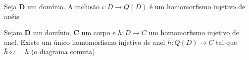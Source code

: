 \begin{proposition}
Seja $\bm D$ um domínio. A inclusão $\iota\colon D \to Q(D)$ é um homomorfismo injetivo de anéis.
\end{proposition}

\begin{proposition}
\label{alg:prop.univer.corpo.frac}
Sejam $\bm D$ um domínio, $\bm C$ um corpo e $h\colon D \to C$ um homomorfismo injetivo de anel. Existe um único homomorfismo injetivo de anel $\bar h\colon Q(D) \to C$ tal que $\bar h \circ \iota = h$ (o diagrama comuta).
\begin{figure}
\centering
{}
\end{figure}
\end{proposition}
